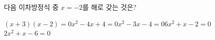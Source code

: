 다음 이차방정식 중 $x=-2$를 해로 갖는 것은?
\begin{choices32}{$(x+3)(x-2)=0$}{$x^2-4x+4=0$}{$x^2-3x-4=0$}{$6x^2+x-2=0$}{$2x^2+x-6=0$}\end{choices32}
